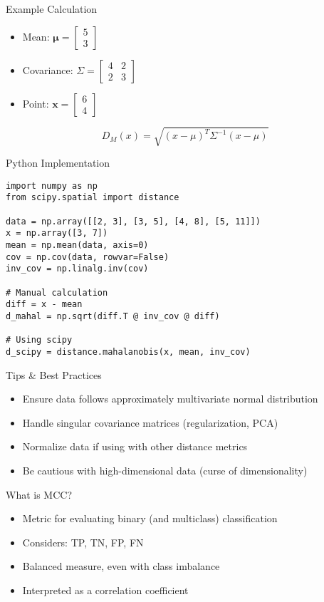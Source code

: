 \documentclass{beamer}
\begin{document}
\begin{frame}{Example Calculation}
  \begin{itemize}
    \item Mean: \( \boldsymbol{\mu} = \begin{bmatrix} 5 \\ 3 \end{bmatrix} \)
    \item Covariance: \( \Sigma = \begin{bmatrix} 4 & 2 \\ 2 & 3 \end{bmatrix} \)
    \item Point: \( \mathbf{x} = \begin{bmatrix} 6 \\ 4 \end{bmatrix} \)
  \end{itemize}
  \vspace{0.5em}
  \[
    D_M(x) = \sqrt{(x - \mu)^T \Sigma^{-1} (x - \mu)}
  \]
\end{frame}
\begin{frame}[fragile]{Python Implementation}
    \small
\begin{verbatim}
import numpy as np
from scipy.spatial import distance

data = np.array([[2, 3], [3, 5], [4, 8], [5, 11]])
x = np.array([3, 7])
mean = np.mean(data, axis=0)
cov = np.cov(data, rowvar=False)
inv_cov = np.linalg.inv(cov)

# Manual calculation
diff = x - mean
d_mahal = np.sqrt(diff.T @ inv_cov @ diff)

# Using scipy
d_scipy = distance.mahalanobis(x, mean, inv_cov)
\end{verbatim}
\end{frame}

\begin{frame}{Tips \& Best Practices}
  \begin{itemize}
    \item Ensure data follows approximately multivariate normal distribution
    \item Handle singular covariance matrices (regularization, PCA)
    \item Normalize data if using with other distance metrics
    \item Be cautious with high-dimensional data (curse of dimensionality)
  \end{itemize}
\end{frame}


\begin{frame}{What is MCC?}
  \begin{itemize}
    \item Metric for evaluating binary (and multiclass) classification
    \item Considers: TP, TN, FP, FN
    \item Balanced measure, even with class imbalance
    \item Interpreted as a correlation coefficient
  \end{itemize}
\end{frame}
\end{document}
